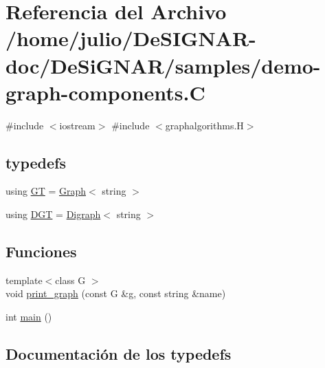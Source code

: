 \hypertarget{demo-graph-components_8_c}{}\section{Referencia del Archivo /home/julio/\+De\+S\+I\+G\+N\+A\+R-\/doc/\+De\+Si\+G\+N\+A\+R/samples/demo-\/graph-\/components.C}
\label{demo-graph-components_8_c}
{\ttfamily \#include $<$iostream$>$}\newline
{\ttfamily \#include $<$graphalgorithms.\+H$>$}\newline
\subsection*{typedefs}
\begin{DoxyCompactItemize}
\item 
using \hyperlink{demo-graph-components_8_c_a668102de43ec3f9488fff7b515d48859}{GT} = \hyperlink{class_designar_1_1_graph}{Graph}$<$ string $>$
\item 
using \hyperlink{demo-graph-components_8_c_a8f123599e859454680bf37e203c0b18b}{D\+GT} = \hyperlink{class_designar_1_1_digraph}{Digraph}$<$ string $>$
\end{DoxyCompactItemize}
\subsection*{Funciones}
\begin{DoxyCompactItemize}
\item 
{\footnotesize template$<$class G $>$ }\\void \hyperlink{demo-graph-components_8_c_af4aa6ad85cbef3cd03726e2b31004df6}{print\+\_\+graph} (const G \&g, const string \&name)
\item 
int \hyperlink{demo-graph-components_8_c_ae66f6b31b5ad750f1fe042a706a4e3d4}{main} ()
\end{DoxyCompactItemize}


\subsection{Documentación de los \textquotesingle{}typedefs\textquotesingle{}}
\mbox{\label{demo-graph-components_8_c_a8f123599e859454680bf37e203c0b18b}} 
